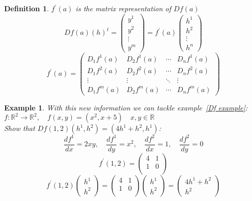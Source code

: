 \documentclass[12pt]{article}
\def\RR{\mathbb{R}}
\newtheorem{definition}{Definition}[section]
\newtheorem{example}{Example}[section]
\begin{document}
\begin{definition}
$f^{'}(a)$ is the matrix representation of $Df(a)$
\[Df(a)(h)^{t}= \left(\! \begin{array}{c} y^{1} \\ y^{2}\\ \vdots\\ y^{m} \end{array}\! \right) = f^{'}(a) \left(\! \begin{array}{c} h^{1} \\ h^{2}\\ \vdots\\ h^{n} \end{array}\! \right) \]
\[ f^{'}(a) = \begin{pmatrix}
  D_{1}f^{1}(a) & D_{2}f^{1}(a) & \cdots &D_{n}f^{1}(a) \\
  D_{1}f^{2}(a) & D_{2}f^{2}(a) & \cdots & D_{n}f^{2}(a) \\
  \vdots  & \vdots  & \ddots & \vdots  \\
  D_{1}f^{m}(a) & D_{2}f^{m}(a) & \cdots & D_{n}f^{m}(a)
 \end{pmatrix}\]
\end{definition}

\begin{example} With this new information we can tackle example~\ref{Df example}:\\
$f:\RR^{2} \rightarrow \RR^{2}, \quad f(x,y)=(x^{2},x+5) \quad x,y \in \RR$\\
Show that $Df(1,2)(h^{1}, h^{2})=(4h^{1} +  h^{2}, h^{1})$:
\[\frac{df^{1}}{dx} = 2xy, \quad \frac{df^{1}}{dy} = x^{2}, \quad \frac{df^{2}}{dx} = 1, \quad \frac{df^{2}}{dy} = 0\]
\[f^{'}(1,2)=\begin{pmatrix}
 4&1 \\
  1&0 \\
 \end{pmatrix}\]
\[f^{'}(1,2) \left(\!\! \begin{array}{c} h^{1} \\  h^{2} \end{array}\!\! \right)= \begin{pmatrix}
 4&1 \\
  1&0 \\
 \end{pmatrix}\!\!\! \left(\!\! \begin{array}{c} h^{1} \\  h^{2} \end{array}\!\! \right)=  \left(\!\!\! \begin{array}{c} 4h^{1} + h^{2}\\  h^{2} \end{array}\!\! \right)\]
\end{example}
\end{document}
